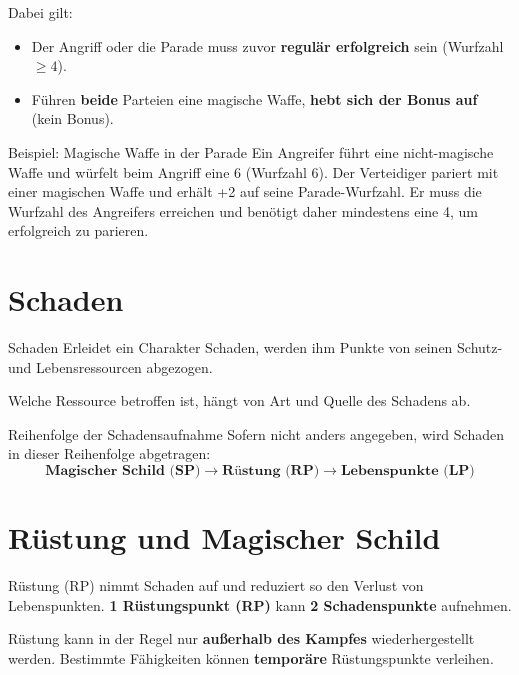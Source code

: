 Dabei gilt:
\begin{itemize}
	\item Der Angriff oder die Parade muss zuvor \textbf{regulär erfolgreich} sein (Wurfzahl $\ge 4$).
	\item Führen \textbf{beide} Parteien eine magische Waffe, \textbf{hebt sich der Bonus auf} (kein Bonus).
\end{itemize}

\begin{examplebox}{Beispiel: Magische Waffe in der Parade}
	Ein Angreifer führt eine nicht-magische Waffe und würfelt beim Angriff eine 6 (Wurfzahl 6).
	Der Verteidiger pariert mit einer magischen Waffe und erhält +2 auf seine Parade-Wurfzahl.
	Er muss die Wurfzahl des Angreifers erreichen und benötigt daher mindestens eine 4,
	um erfolgreich zu parieren.
\end{examplebox}


\section{Schaden}

\begin{rulebox}{Schaden}
	Erleidet ein Charakter Schaden, werden ihm Punkte von seinen Schutz- und
	Lebensressourcen abgezogen.
\end{rulebox}

Welche Ressource betroffen ist, hängt von Art und Quelle des Schadens ab.
\begin{rulebox}{Reihenfolge der Schadensaufnahme}
	Sofern nicht anders angegeben, wird Schaden in dieser Reihenfolge abgetragen:
	\[
	\textbf{Magischer Schild (SP)} \rightarrow \textbf{Rüstung (RP)} \rightarrow \textbf{Lebenspunkte (LP)}
	\]
\end{rulebox}

\section{Rüstung und Magischer Schild}

\begin{rulebox}{Rüstung (RP)}
	 nimmt Schaden auf und reduziert so den Verlust von Lebenspunkten.  
	\textbf{1 Rüstungspunkt (RP)} kann \textbf{2 Schadenspunkte} aufnehmen.
	
	Rüstung kann in der Regel nur \textbf{außerhalb des Kampfes} wiederhergestellt werden.
	Bestimmte Fähigkeiten können \textbf{temporäre} Rüstungspunkte verleihen.
\end{rulebox}

